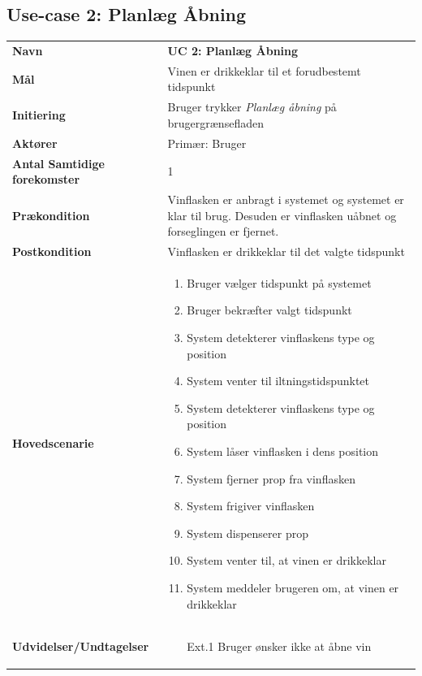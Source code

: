 \pagebreak

\subsection{Use-case 2: Planlæg Åbning}
\begin{longtable}{>{\bfseries}p{100pt} p{300pt}}
	
	Navn & \bfseries{UC 2: Planlæg Åbning} \\
	Mål & Vinen er drikkeklar til et forudbestemt tidspunkt\\
	Initiering & Bruger trykker \emph{Planlæg åbning} på brugergrænsefladen\\
	Aktører & Primær: Bruger \\
	Antal Samtidige forekomster & 1 \\
	Prækondition & Vinflasken er anbragt i systemet og systemet er klar til brug. Desuden er vinflasken uåbnet og forseglingen er fjernet. \\
	Postkondition & Vinflasken er drikkeklar til det valgte tidspunkt\\
	Hovedscenarie & \begin{enumerate}
		\item Bruger vælger tidspunkt på systemet
		\subitem [Ext. 1: Bruger ønsker ikke at åbne vin] 
		\item Bruger bekræfter valgt tidspunkt
		\subitem [Ext. 2: Vinen kan ikke iltes korrekt til det valgte tidspunkt]
		\item System detekterer vinflaskens type og position
		\subitem [Ext. 3: System registrerer ugyldig type af vinflaske]
		\subitem [Ext. 4: System kan ikke registrere en vinflaske]
		\item System venter til iltningstidspunktet
		\subitem [Ext. 5: Bruger annullerer planlagt åbning af vin]
		\item System detekterer vinflaskens type og position
		\subitem [Ext. 3: System registrerer ugyldig type af vinflaske]
		\subitem [Ext. 4: System kan ikke registrere en vinflaske]
		\item System låser vinflasken i dens position
		\item System fjerner prop fra vinflasken
		\item System frigiver vinflasken
		\item System dispenserer prop
		\item System venter til, at vinen er drikkeklar
		\item System meddeler brugeren om, at vinen er drikkeklar		
	\end{enumerate} \\
	Udvidelser/Undtagelser & 
	\begin{enumerate}
		\item[Ext.1] Bruger ønsker ikke at åbne vin
		

\end{enumerate}
\end{longtable}
